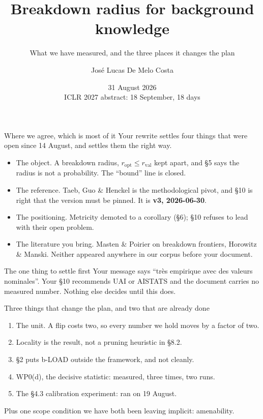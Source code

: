 \documentclass[10pt,aspectratio=169]{beamer}
\title{Breakdown radius for background knowledge}
\subtitle{What we have measured, and the three places it changes the plan}
\author{José Lucas De Melo Costa}
\institute{with Seong Woo (Chris) Ahn \\ CentraleSupélec, Université Paris-Saclay, LISN}
\date{31 August 2026 \\ \small ICLR 2027 abstract: 18 September, 18 days}
\newcommand{\ok}[1]{\textcolor{good}{#1}}
\newcommand{\no}[1]{\textcolor{bad}{#1}}
\newcommand{\wn}[1]{\textcolor{warn}{#1}}
\begin{document}
\maketitle

\begin{frame}[shrink=8]{Where we agree, which is most of it}
Your rewrite settles four things that were open since 14 August, and settles them the right way.
\begin{itemize}
  \item \ok{The object.} A breakdown radius, $r_{\mathrm{opt}} \le r_{\mathrm{val}}$ kept apart, and
        \S5 says the radius is not a probability. The ``bound'' line is closed.
  \item \ok{The reference.} Taeb, Guo \& Henckel is the methodological pivot, and \S10 is right that
        the version must be pinned. It is \textbf{v3, 2026-06-30}.
  \item \ok{The positioning.} Metricity demoted to a corollary (\S6); \S10 refuses to lead with
        their open problem.
  \item \ok{The literature you bring.} Masten \& Poirier on breakdown frontiers, Horowitz \& Manski.
        Neither appeared anywhere in our corpus before your document.
\end{itemize}
\vfill
\begin{alertblock}{The one thing to settle first}
Your message says ``très empirique avec des valeurs nominales''. Your \S10 recommends UAI or
AISTATS and the document carries no measured number. Nothing else decides until this does.
\end{alertblock}
\end{frame}

\begin{frame}{Three things that change the plan, and two that are already done}
\begin{enumerate}
  \item \no{The unit.} A flip costs two, so every number we hold moves by a factor of two.
  \item \no{Locality is the result}, not a pruning heuristic in \S8.2.
  \item \no{\S2 puts b-LOAD outside the framework}, and not cleanly.
\end{enumerate}
\vspace{1em}
\begin{enumerate}\setcounter{enumi}{3}
  \item \ok{WP0(d), the decisive statistic}: measured, three times, two runs.
  \item \ok{The \S4.3 calibration experiment}: ran on 19 August.
\end{enumerate}
\vspace{1em}
Plus one scope condition we have both been leaving implicit: \wn{amenability}.
\end{frame}
\end{document}
